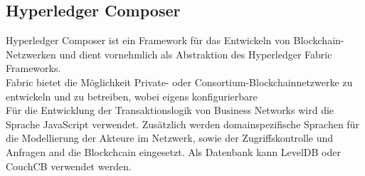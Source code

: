 \subsection{Hyperledger Composer}
\label{sec:prototype_composer}
        Hyperledger Composer ist ein Framework für das Entwickeln von Blockchain-Netzwerken und dient vornehmlich als Abstraktion des Hyperledger Fabric Frameworks. 
        \medskip\\
        Fabric bietet die Möglichkeit Private- oder Consortium-Blockchainnetzwerke zu entwickeln und zu betreiben, wobei eigens konfigurierbare 
        \medskip\\
        \noindent Für die Entwicklung der Transaktionslogik von Business Networks wird die Sprache JavaScript verwendet. 
        Zusätzlich werden domainspezifische Sprachen für die Modellierung der Akteure im Netzwerk, sowie der Zugriffskontrolle und Anfragen and die Blockchcain eingesetzt.
        Als Datenbank kann LevelDB oder CouchCB verwendet werden. 
        
